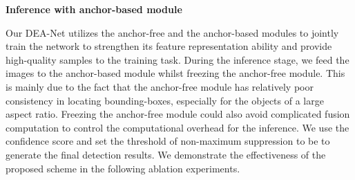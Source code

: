 \documentclass[journal]{IEEEtran}
\newcommand{\myparagraph}[1]{\vspace{0.1em}\noindent\textbf{#1}}
\begin{document}
\begin{table*}[!htb]
	\begin{center}
	\renewcommand\tabcolsep{2.6pt}
	\begin{threeparttable}
		\end{threeparttable}
	\end{center}
	\caption{The comparison of efficiency between our proposed method and the method of preset more small anchors on DOTA~\cite{xia2018dota} for oriented object detection. ``Baseline'' indicates the Faster RCNN with the backbone of ResNet-101. ``+ Anchor'' indicates the implementation of more small anchors on the baseline networks. ``+ DEA'' indicates the implementation of our proposed module on the baseline networks.}
	\label{t111}
\end{table*}


\myparagraph{Inference with anchor-based module} 

Our DEA-Net utilizes the anchor-free and the anchor-based modules to jointly train the network to strengthen its feature representation ability and provide high-quality samples to the training task. During the inference stage, we feed the images to the anchor-based module whilst freezing the anchor-free module. This is mainly due to the fact that the anchor-free module has relatively poor consistency in locating bounding-boxes, especially for the objects of a large aspect ratio. Freezing the anchor-free module could also avoid complicated fusion computation to control the computational overhead for the inference. We use the confidence score  and set the threshold of non-maximum suppression to be  to generate the final detection results. We demonstrate the effectiveness of the proposed scheme in the following ablation experiments.
\end{document}
